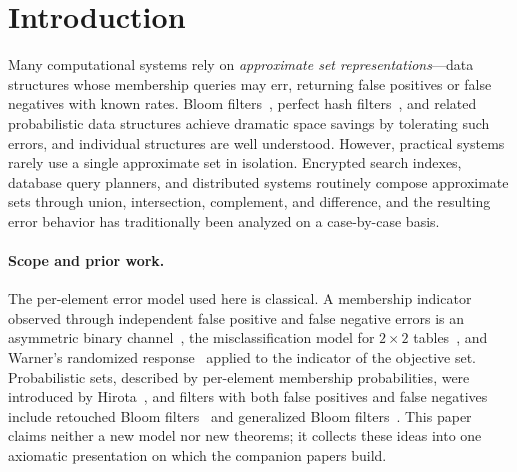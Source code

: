 
\section{Introduction}

Many computational systems rely on \emph{approximate set representations}---data structures whose membership queries may err, returning false positives or false negatives with known rates.
Bloom filters~\cite{bf}, perfect hash filters~\cite{phf}, and related probabilistic data structures achieve dramatic space savings by tolerating such errors, and individual structures are well understood.
However, practical systems rarely use a single approximate set in isolation.
Encrypted search indexes, database query planners, and distributed systems routinely compose approximate sets through union, intersection, complement, and difference, and the resulting error behavior has traditionally been analyzed on a case-by-case basis.

\paragraph{Scope and prior work.}
The per-element error model used here is classical.
A membership indicator observed through independent false positive and false negative errors is an asymmetric binary channel~\cite{shannonBSC}, the misclassification model for $2 \times 2$ tables~\cite{bross1954misclassification}, and Warner's randomized response~\cite{warner1965} applied to the indicator of the objective set.
Probabilistic sets, described by per-element membership probabilities, were introduced by Hirota~\cite{hirota1981probabilistic}, and filters with both false positives and false negatives include retouched Bloom filters~\cite{donnet2006retouched} and generalized Bloom filters~\cite{laufer2011generalized}.
This paper claims neither a new model nor new theorems; it collects these ideas into one axiomatic presentation on which the companion papers build.

